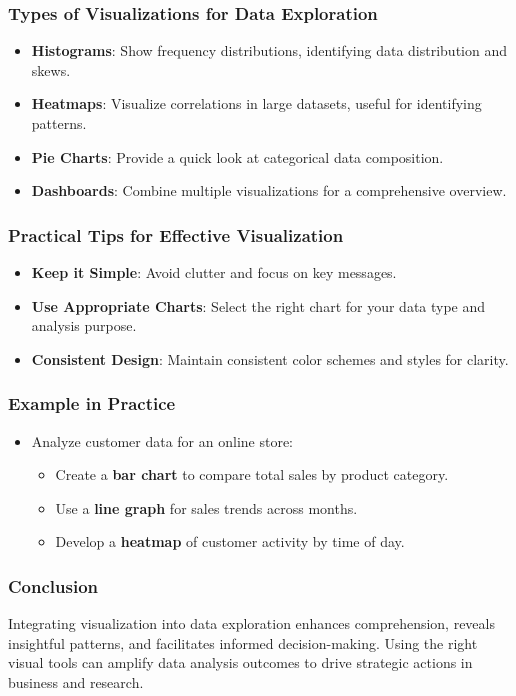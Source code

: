 \documentclass[aspectratio=169]{beamer}
\begin{document}
\begin{frame}[fragile]
    \frametitle{Types of Visualizations for Data Exploration}
    \begin{itemize}
        \item \textbf{Histograms}: Show frequency distributions, identifying data distribution and skews.
        \item \textbf{Heatmaps}: Visualize correlations in large datasets, useful for identifying patterns.
        \item \textbf{Pie Charts}: Provide a quick look at categorical data composition.
        \item \textbf{Dashboards}: Combine multiple visualizations for a comprehensive overview.
    \end{itemize}
\end{frame}

\begin{frame}[fragile]
    \frametitle{Practical Tips for Effective Visualization}
    \begin{itemize}
        \item \textbf{Keep it Simple}: Avoid clutter and focus on key messages.
        \item \textbf{Use Appropriate Charts}: Select the right chart for your data type and analysis purpose.
        \item \textbf{Consistent Design}: Maintain consistent color schemes and styles for clarity.
    \end{itemize}
\end{frame}

\begin{frame}[fragile]
    \frametitle{Example in Practice}
    \begin{itemize}
        \item Analyze customer data for an online store:
            \begin{itemize}
                \item Create a \textbf{bar chart} to compare total sales by product category.
                \item Use a \textbf{line graph} for sales trends across months.
                \item Develop a \textbf{heatmap} of customer activity by time of day.
            \end{itemize}
    \end{itemize}
\end{frame}

\begin{frame}[fragile]
    \frametitle{Conclusion}
    Integrating visualization into data exploration enhances comprehension, reveals insightful patterns, and facilitates informed decision-making. Using the right visual tools can amplify data analysis outcomes to drive strategic actions in business and research.
\end{frame}
\end{document}
